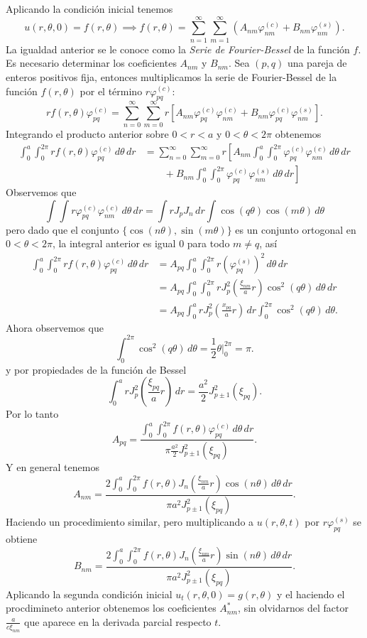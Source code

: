 \documentclass[11pt,letterpaper]{report}
\newcommand\<{\langle}
\renewcommand\>{\rangle}
\renewcommand\phi\varphi
\begin{document}
Aplicando la condición inicial tenemos
\[
  u(r,\theta,0) = f(r,\theta)
  \implies
  f(r,\theta) = \sum_{n=1}^\infty\sum_{m=1}^\infty
            \left(
            A_{nm}\phi_{nm}^{(c)}
            + B_{nm}\phi_{nm}^{(s)}
            \right).
\] La igualdad anterior se le conoce como la \textit{Serie de Fourier-Bessel}
de la función $f$. Es necesario determinar los coeficientes $A_{nm}$
y $B_{nm}$. Sea $(p,q)$ una pareja de enteros positivos fija, 
entonces multiplicamos la serie de Fourier-Bessel de la función 
$f(r,\theta)$ por el término $r\phi_{pq}^{(c)}$:
\[
  rf(r,\theta)\phi_{pq}^{(c)} =
  \sum_{n=0}^\infty\sum_{m=0}^\infty
  r\left[
  A_{nm}\phi_{pq}^{(c)}\phi_{nm}^{(c)}
  + B_{nm}\phi_{pq}^{(c)}\phi_{nm}^{(s)}
  \right].
\] Integrando el producto anterior sobre $0 < r < a$ y $0 < \theta < 2\pi$ obtenemos
\begin{align*}
  \int_{0}^{a} \int_{0}^{2\pi} rf(r,\theta)\phi_{pq}^{(c)} \, d\theta \, dr &= 
  \sum_{n=0}^\infty\sum_{m=0}^\infty
  r \left[
    A_{nm} \int_{0}^{a} \int_{0}^{2\pi} \phi_{pq}^{(c)}\phi_{nm}^{(c)} \, d\theta \, dr \right.\\
  &\quad\quad + \left.
B_{nm} \int_{0}^{a} \int_{0}^{2\pi} \phi_{pq}^{(c)}\phi_{nm}^{(s)} \, d\theta \, dr\right]
\end{align*}
Observemos que
\[
  \int \int r\phi_{pq}^{(c)}\phi_{nm}^{(c)} \, d\theta \, dr = \int r J_p J_n \, dr \int \cos(q\theta)\cos(m\theta) \, d\theta
\] pero dado que el conjunto $\{\cos(n\theta), \sin(m\theta)\}$ es un conjunto ortogonal en $0 < \theta < 2\pi$, la integral anterior es igual 0 para todo $m \neq q$, así
\begin{align*}
  \int_{0}^{a} \int_{0}^{2\pi} rf(r,\theta)\phi_{pq}^{(c)} \, d\theta \, dr &=
  A_{pq} \int_{0}^{a} \int_{0}^{2\pi} r\left(\phi_{pq}^{(s)}\right)^2 \, d\theta \, dr\\
  &= A_{pq} \int_{0}^{a} \int_{0}^{2\pi} r J_p^2\left(\frac{\xi_{nm}}{a}r\right)\cos^2(q\theta) \, d\theta \, dr\\
  &= A_{pq} \int_{0}^{a} r J_p^2\left(\frac{x_{pq}}{a}r\right) \, dr \int_{0}^{2\pi} \cos^2(q\theta) \, d\theta.
\end{align*}
Ahora observemos que
\[
  \int_{0}^{2\pi} \cos^2(q\theta) \, d\theta = \frac{1}{2}\theta\bigg|_0^{2\pi} = \pi.
\] y por propiedades de la función de Bessel
\[
  \int_{0}^{a} r J_p^2\left(\frac{\xi_{pq}}{a}r\right) \, dr = \frac{a^2}{2} J_{p\pm1}^2\left(\xi_{pq}\right).
\] Por lo tanto
\[
  A_{pq} = \frac{\int_{0}^{a} \int_{0}^{2\pi} f(r,\theta)\phi_{pq}^{(c)} \, d\theta \, dr}{\pi \frac{a^2}{2} J_{p\pm1}^2(\xi_{pq})}.
\] Y en general tenemos
\[
  A_{nm} = \frac{2\int_{0}^{a} \int_{0}^{2\pi} f(r,\theta) J_n\left(\frac{\xi_{nm}}{a}r\right)\cos(n\theta) \, d\theta \, dr}{\pi a^2 J_{p\pm1}^2(\xi_{pq})}.
\] Haciendo un procedimiento similar, pero multiplicando a $u(r,\theta,t)$ por $r\phi_{pq}^{(s)}$ se obtiene
\[
  B_{nm} = \frac{2\int_{0}^{a} \int_{0}^{2\pi} f(r,\theta) J_n\left(\frac{\xi_{nm}}{a}r\right)\sin(n\theta) \, d\theta \, dr}{\pi a^2 J_{p\pm1}^2(\xi_{pq})}.
\] Aplicando la segunda condición inicial $u_t(r,\theta,0) = g(r,\theta)$ y el haciendo el procdimineto anterior obtenemos los coeficientes $A_{nm}^{\ast}$, sin olvidarnos del factor $\frac{a}{c\xi_{nm}}$ que aparece en la derivada parcial respecto $t$.
\end{document}
